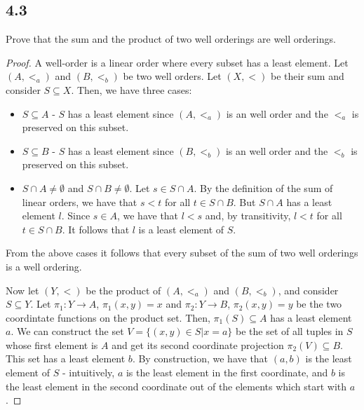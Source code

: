 \subsection*{4.3}
Prove that the sum and the product of two well orderings are well orderings.
\begin{proof}
A well-order is a linear order where every subset has a least element. Let $(A, <_a)$ and $(B, <_b)$ be two well orders. Let $(X, <)$ be their sum and consider $S \subseteq X$. Then, we have three cases: 

\begin{itemize}
    \item $S \subseteq A$ - $S$ has a least element since $(A, <_a)$ is an well order and the $<_a$ is preserved on this subset.
    \item $S \subseteq B$ - $S$ has a least element since $(B, <_b)$ is an well order and the $<_b$ is preserved on this subset.
    \item $S \cap A \neq \emptyset$ and $S \cap B \neq \emptyset$. Let $s \in S \cap A$. By the definition of the sum of linear orders, we have that $s < t$ for all $t \in S \cap B$. But $S \cap A$ has a least element $l$. Since $s \in A$, we have that $l < s$ and, by transitivity, $l < t$ for all $t \in S \cap B$. It follows that $l$ is a least element of $S$.
\end{itemize}

From the above cases it follows that every subset of the sum of two well orderings is a well ordering.

\vspace{1em}

Now let $(Y, <)$ be the product of $(A, <_a)$ and $(B, <_b)$, and consider $S \subseteq Y$. Let $\pi_1: Y \rightarrow A$, $\pi_1(x,y) = x$ and $\pi_2: Y \rightarrow B$, $\pi_2(x,y) = y$ be the two coordintate functions on the product set. Then, $\pi_1(S) \subseteq A$ has a least element $a$. We can construct the set $V = \{(x,y) \in S | x = a\}$ be the set of all tuples in $S$ whose first element is $A$ and get its second coordinate projection $\pi_2(V) \subseteq B$. This set has a least element $b$. By construction, we have that $(a,b)$ is the least element of $S$ - intuitively, $a$ is the least element in the first coordinate, and $b$ is the least element in the second coordinate out of the elements which start with $a$.

\end{proof}

\newpage

